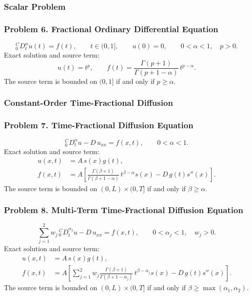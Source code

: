 \documentclass[11pt]{article}
\newcommand{\Caputo}[1]{{}^{C}_{0}D_t^{#1}}
\begin{document}
\subsubsection*{Scalar Problem}

\subsubsection*{Problem 6. Fractional Ordinary Differential Equation}

\[
\boxed{\Caputo{\alpha}u(t)=f(t)},
\qquad t\in(0,1],
\qquad u(0)=0,
\qquad 0<\alpha<1,
\quad p>0.
\]
Exact solution and source term:
\[
u(t)=t^p,
\qquad
f(t)=
\frac{\Gamma(p+1)}{\Gamma(p+1-\alpha)}\,
t^{p-\alpha}.
\]
The source term is bounded on $(0,1]$ if and only if $p\ge\alpha$.

\subsubsection*{Constant-Order Time-Fractional Diffusion}

\subsubsection*{Problem 7. Time-Fractional Diffusion Equation}

\[
\boxed{\Caputo{\alpha}u-D\,u_{xx}=f(x,t)},
\qquad 0<\alpha<1.
\]
Exact solution and source term:
\[
\begin{aligned}
u(x,t)&=A\,s(x)g(t),\\
f(x,t)&=A\left[
\frac{\Gamma(\beta+1)}{\Gamma(\beta+1-\alpha)}\,
t^{\beta-\alpha}s(x)-D\,g(t)s''(x)
\right].
\end{aligned}
\]
The source term is bounded on $(0,L)\times(0,T]$ if and only if
$\beta\ge\alpha$.

\subsubsection*{Problem 8. Multi-Term Time-Fractional Diffusion Equation}

\[
\boxed{
\sum_{j=1}^{2}w_j\,\Caputo{\alpha_j}u
-D\,u_{xx}=f(x,t)
},
\qquad 0<\alpha_j<1,
\quad w_j>0.
\]
Exact solution and source term:
\[
\begin{aligned}
u(x,t)&=A\,s(x)g(t),\\
f(x,t)&=
A\left[
\sum_{j=1}^{2}
w_j\frac{\Gamma(\beta+1)}
{\Gamma(\beta+1-\alpha_j)}\,
t^{\beta-\alpha_j}s(x)
-D\,g(t)s''(x)
\right].
\end{aligned}
\]
The source term is bounded on $(0,L)\times(0,T]$ if and only if
$\beta\ge\max(\alpha_1,\alpha_2)$.
\end{document}
